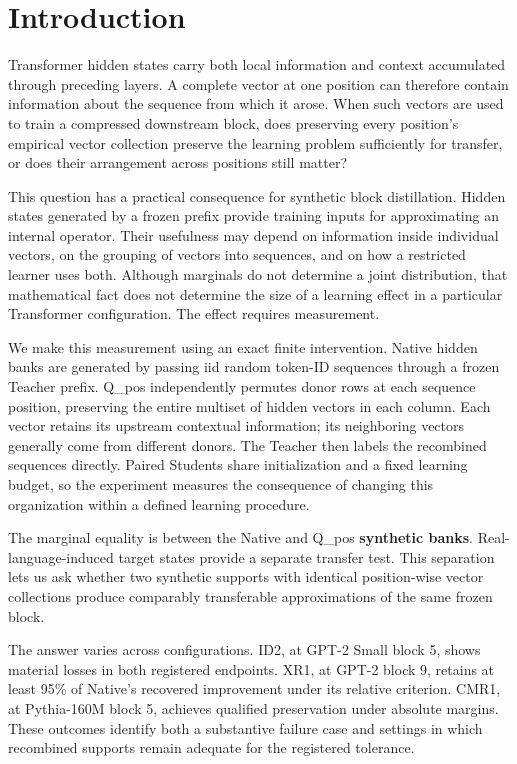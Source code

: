 \section{Introduction}\label{introduction}

Transformer hidden states carry both local information and context accumulated through preceding layers. A complete vector at one position can therefore contain information about the sequence from which it arose. When such vectors are used to train a compressed downstream block, does preserving every position's empirical vector collection preserve the learning problem sufficiently for transfer, or does their arrangement across positions still matter?

This question has a practical consequence for synthetic block distillation. Hidden states generated by a frozen prefix provide training inputs for approximating an internal operator. Their usefulness may depend on information inside individual vectors, on the grouping of vectors into sequences, and on how a restricted learner uses both. Although marginals do not determine a joint distribution, that mathematical fact does not determine the size of a learning effect in a particular Transformer configuration. The effect requires measurement.

We make this measurement using an exact finite intervention. Native hidden banks are generated by passing iid random token-ID sequences through a frozen Teacher prefix. Q\_pos independently permutes donor rows at each sequence position, preserving the entire multiset of hidden vectors in each column. Each vector retains its upstream contextual information; its neighboring vectors generally come from different donors. The Teacher then labels the recombined sequences directly. Paired Students share initialization and a fixed learning budget, so the experiment measures the consequence of changing this organization within a defined learning procedure.

The marginal equality is between the Native and Q\_pos \textbf{synthetic banks}. Real-language-induced target states provide a separate transfer test. This separation lets us ask whether two synthetic supports with identical position-wise vector collections produce comparably transferable approximations of the same frozen block.

The answer varies across configurations. ID2, at GPT-2 Small block 5, shows material losses in both registered endpoints. XR1, at GPT-2 block 9, retains at least 95\% of Native's recovered improvement under its relative criterion. CMR1, at Pythia-160M block 5, achieves qualified preservation under absolute margins. These outcomes identify both a substantive failure case and settings in which recombined supports remain adequate for the registered tolerance.

